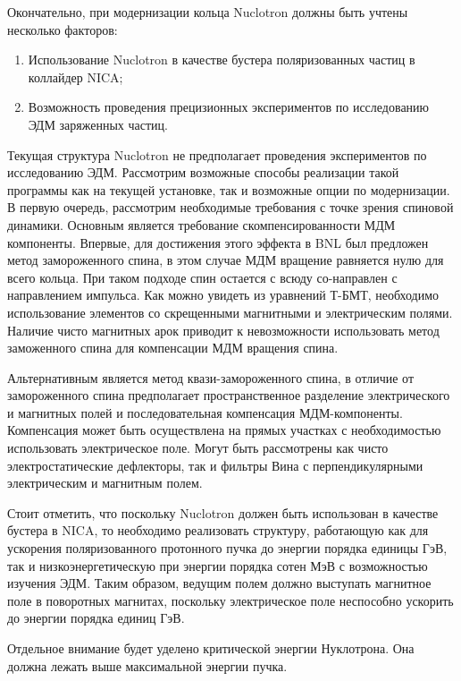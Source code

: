 Окончательно, при модернизации кольца Nuclotron должны быть учтены несколько факторов:

\begin{enumerate}
    \item Использование Nuclotron в качестве бустера поляризованных частиц в коллайдер NICA;
    \item Возможность проведения прецизионных экспериментов по исследованию ЭДМ заряженных частиц.
\end{enumerate}

\noindent Текущая структура Nuclotron не предполагает проведения экспериментов по исследованию ЭДМ. Рассмотрим возможные способы реализации такой программы как на текущей установке, так и возможные опции по модернизации. В первую очередь, рассмотрим необходимые требования с точке зрения спиновой динамики. Основным является требование скомпенсированности МДМ компоненты. Впервые, для достижения этого эффекта в BNL был предложен метод замороженного спина, в этом случае МДМ вращение равняется нулю для всего кольца. При таком подходе спин остается с всюду со-направлен с направлением импульса. Как можно увидеть из уравнений Т-БМТ, необходимо использование элементов со скрещенными магнитными и электрическим полями. 
Наличие чисто магнитных арок приводит к невозможности использовать метод заможенного спина для компенсации МДМ вращения спина. 

\par Альтернативным является метод квази-замороженного спина, в отличие от замороженного спина предполагает пространственное разделение электрического и магнитных полей и последовательная компенсация МДМ-компоненты. Компенсация может быть осуществлена на прямых участках с необходимостью использовать электрическое поле. Могут быть рассмотрены как чисто электростатические дефлекторы, так и фильтры Вина с перпендикулярными электрическим и магнитным полем.

\par Стоит отметить, что поскольку Nuclotron должен быть использован в качестве бустера в NICA, то необходимо реализовать структуру, работающую как для ускорения поляризованного протонного пучка до энергии порядка единицы ГэВ, так и низкоэнергетическую при энергии порядка сотен МэВ с возможностью изучения ЭДМ. Таким образом, ведущим полем должно выступать магнитное поле в поворотных магнитах, поскольку электрическое поле неспособно ускорить до энергии порядка единиц ГэВ. 

\par Отдельное внимание будет уделено критической энергии Нуклотрона. Она должна лежать выше максимальной энергии пучка.
	
